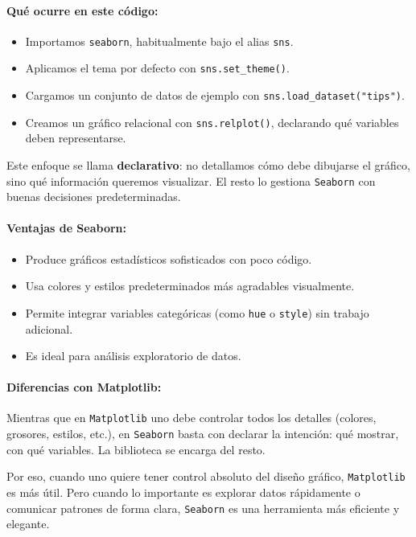 \documentclass{article}
\theoremstyle{nonumberplain}
\begin{document}
\paragraph{Qué ocurre en este código:}
\begin{itemize}
    \item Importamos \texttt{seaborn}, habitualmente bajo el alias \texttt{sns}.
    \item Aplicamos el tema por defecto con \texttt{sns.set\_theme()}.
    \item Cargamos un conjunto de datos de ejemplo con \texttt{sns.load\_dataset("tips")}.
    \item Creamos un gráfico relacional con \texttt{sns.relplot()}, declarando qué variables deben representarse.
\end{itemize}

Este enfoque se llama \textbf{declarativo}: no detallamos cómo debe dibujarse el gráfico, sino qué información queremos visualizar. El resto lo gestiona \texttt{Seaborn} con buenas decisiones predeterminadas.

\paragraph{Ventajas de Seaborn:}
\begin{itemize}
    \item Produce gráficos estadísticos sofisticados con poco código.
    \item Usa colores y estilos predeterminados más agradables visualmente.
    \item Permite integrar variables categóricas (como \texttt{hue} o \texttt{style}) sin trabajo adicional.
    \item Es ideal para análisis exploratorio de datos.
\end{itemize}

\paragraph{Diferencias con Matplotlib:}

Mientras que en \texttt{Matplotlib} uno debe controlar todos los detalles (colores, grosores, estilos, etc.), en \texttt{Seaborn} basta con declarar la intención: qué mostrar, con qué variables. La biblioteca se encarga del resto.

Por eso, cuando uno quiere tener control absoluto del diseño gráfico, \texttt{Matplotlib} es más útil. Pero cuando lo importante es explorar datos rápidamente o comunicar patrones de forma clara, \texttt{Seaborn} es una herramienta más eficiente y elegante.
\end{document}
